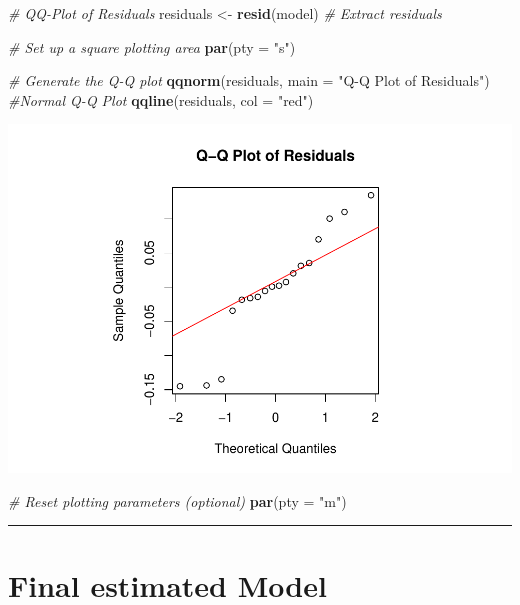 \documentclass[
  12pt,
]{article}
\newenvironment{Shaded}{\begin{snugshade}}{\end{snugshade}}
\newcommand{\AttributeTok}[1]{\textcolor[rgb]{0.13,0.29,0.53}{#1}}
\newcommand{\CommentTok}[1]{\textcolor[rgb]{0.56,0.35,0.01}{\textit{#1}}}
\newcommand{\FunctionTok}[1]{\textcolor[rgb]{0.13,0.29,0.53}{\textbf{#1}}}
\newcommand{\NormalTok}[1]{#1}
\newcommand{\OtherTok}[1]{\textcolor[rgb]{0.56,0.35,0.01}{#1}}
\newcommand{\StringTok}[1]{\textcolor[rgb]{0.31,0.60,0.02}{#1}}
\begin{document}
\begin{Shaded}
\begin{Highlighting}[]
\CommentTok{\# QQ{-}Plot of Residuals}
\NormalTok{residuals }\OtherTok{\textless{}{-}} \FunctionTok{resid}\NormalTok{(model)  }\CommentTok{\# Extract residuals}

\CommentTok{\# Set up a square plotting area}
\FunctionTok{par}\NormalTok{(}\AttributeTok{pty =} \StringTok{"s"}\NormalTok{)  }

\CommentTok{\# Generate the Q{-}Q plot}
\FunctionTok{qqnorm}\NormalTok{(residuals, }\AttributeTok{main =} \StringTok{"Q{-}Q Plot of Residuals"}\NormalTok{) }\CommentTok{\#Normal Q{-}Q Plot}
\FunctionTok{qqline}\NormalTok{(residuals, }\AttributeTok{col =} \StringTok{"red"}\NormalTok{)}
\end{Highlighting}
\end{Shaded}

\includegraphics{report1_r1_files/figure-latex/unnamed-chunk-19-1.pdf}

\begin{Shaded}
\begin{Highlighting}[]
\CommentTok{\# Reset plotting parameters (optional)}
\FunctionTok{par}\NormalTok{(}\AttributeTok{pty =} \StringTok{"m"}\NormalTok{)  }
\end{Highlighting}
\end{Shaded}

\begin{center}\rule{0.5\linewidth}{0.5pt}\end{center}

\section{Final estimated Model}\label{final-estimated-model}
\end{document}
